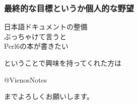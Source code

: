 \documentclass[14pt,dvipdfm,trans]{beamer}
\begin{document}
\begin{frame}
 \frametitle{最終的な目標というか個人的な野望}
\begin{center}
 \Large{日本語ドキュメントの整備}\\
 \vspace*{1zh}
 \small{ぶっちゃけて言うと}\\
 \vspace*{1zh}
\huge{Perl6の本が書きたい}
\end{center}
\end{frame}

\begin{frame}
\vspace*{1zh}
 ということで興味を持ってくれた方は\\
\begin{center}
 \huge{@VienosNotes}\\
\vspace*{0.5zh}
\end{center}
\begin{flushright}
 \normalsize{までよろしくお願いします。} 
\end{flushright}
\end{frame}
\end{document}
